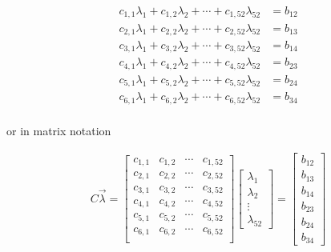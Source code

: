 \begin{itemize}
\begin{align}
    c_{1,1}\lambda_1 + c_{1,2}\lambda_2 + \cdots + c_{1,52}\lambda_52 &= b_{12} \\
    c_{2,1}\lambda_1 + c_{2,2}\lambda_2 + \cdots + c_{2,52}\lambda_52 &= b_{13} \\
    c_{3,1}\lambda_1 + c_{3,2}\lambda_2 + \cdots + c_{3,52}\lambda_52 &= b_{14} \\
    c_{4,1}\lambda_1 + c_{4,2}\lambda_2 + \cdots + c_{4,52}\lambda_52 &= b_{23} \\
    c_{5,1}\lambda_1 + c_{5,2}\lambda_2 + \cdots + c_{5,52}\lambda_52 &= b_{24} \\
    c_{6,1}\lambda_1 + c_{6,2}\lambda_2 + \cdots + c_{6,52}\lambda_52 &= b_{34} \\
\end{align}

or in matrix notation

\begin{gather}
    C\vec{\lambda}
    =
    \begin{bmatrix}
        c_{1,1} & c_{1,2} & \cdots & c_{1,52} \\
        c_{2,1} & c_{2,2} & \cdots & c_{2,52} \\
        c_{3,1} & c_{3,2} & \cdots & c_{3,52} \\
        c_{4,1} & c_{4,2} & \cdots & c_{4,52} \\
        c_{5,1} & c_{5,2} & \cdots & c_{5,52} \\
        c_{6,1} & c_{6,2} & \cdots & c_{6,52} \\
    \end{bmatrix}
    \left[ \begin{array}{c} \lambda_1 \\ \lambda_2 \\ \vdots \\ \lambda_{52} \end{array} \right]
    =
    \left[ \begin{array}{c} b_{12} \\ b_{13} \\ b_{14} \\ b_{23} \\ b_{24} \\ b_{34}  \end{array} \right]
\end{gather}


\end{itemize}
